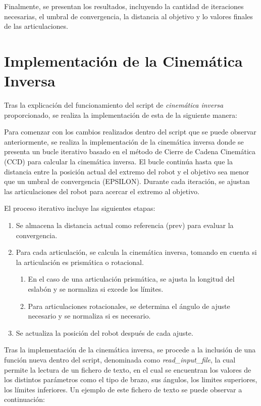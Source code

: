 \documentclass[11pt]{report}
\begin{document}
Finalmente, se presentan los resultados, incluyendo la cantidad de iteraciones necesarias, el umbral de convergencia, la distancia al objetivo y lo valores finales de las articulaciones.

\section{Implementación de la Cinemática Inversa}

Tras la explicación del funcionamiento del script de \emph{cinemática inversa} proporcionado, se realiza la implementación de esta de la siguiente manera:



Para comenzar con los cambios realizados dentro del script que se puede observar anteriormente, se realiza la implementación de la cinemática inversa donde se presenta un bucle iterativo basado en el método de Cierre de Cadena Cinemática (CCD) para calcular la cinemática inversa. El bucle continúa hasta que la distancia entre la posición actual del extremo del robot y el objetivo sea menor que un umbral de convergencia (EPSILON). Durante cada iteración, se ajustan las articulaciones del robot para acercar el extremo al objetivo.

El proceso iterativo incluye las siguientes etapas:

\begin{enumerate}
    \item Se almacena la distancia actual como referencia (prev) para evaluar la convergencia.
    \item Para cada articulación, se calcula la cinemática inversa, tomando en cuenta si la articulación es prismática o rotacional.
    \begin{enumerate}
        \item En el caso de una articulación prismática, se ajusta la longitud del eslabón y se normaliza si excede los límites.
        \item Para articulaciones rotacionales, se determina el ángulo de ajuste necesario y se normaliza si es necesario.
    \end{enumerate}
    \item Se actualiza la posición del robot después de cada ajuste.
\end{enumerate}

Tras la implementación de la cinemática inversa, se procede a la inclusión de una función nueva dentro del script, denominada 
como \emph{read\_input\_file}, la cual permite la lectura de un fichero de texto, en el cual se encuentran los valores de los 
distintos parámetros como el tipo de brazo, sus ángulos, los limites superiores, los límites inferiores. Un ejemplo de este 
fichero de texto se puede observar a continuación:
\end{document}

